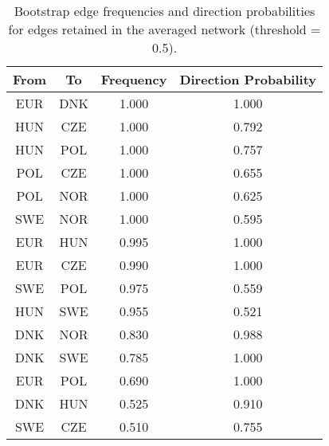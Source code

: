 \begin{table}[!h]
\centering
\caption{Bootstrap edge frequencies and direction probabilities for edges retained in the averaged network (threshold = 0.5).}
\centering
\begin{tabular}[t]{cccc}
\toprule
From & To & Frequency & Direction Probability\\
\midrule
EUR & DNK & 1.000 & 1.000\\
HUN & CZE & 1.000 & 0.792\\
HUN & POL & 1.000 & 0.757\\
POL & CZE & 1.000 & 0.655\\
POL & NOR & 1.000 & 0.625\\
\addlinespace
SWE & NOR & 1.000 & 0.595\\
EUR & HUN & 0.995 & 1.000\\
EUR & CZE & 0.990 & 1.000\\
SWE & POL & 0.975 & 0.559\\
HUN & SWE & 0.955 & 0.521\\
\addlinespace
DNK & NOR & 0.830 & 0.988\\
DNK & SWE & 0.785 & 1.000\\
EUR & POL & 0.690 & 1.000\\
DNK & HUN & 0.525 & 0.910\\
SWE & CZE & 0.510 & 0.755\\
\bottomrule
\end{tabular}
\end{table}
